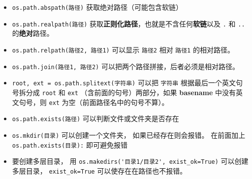 \begin{itemize}
\item \verb`os.path.abspath(路径)` 获取绝对路径（可能包含软链）
\item \verb`os.path.realpath(路径)` 获取\textbf{正则化路径}，也就是不含任何\textbf{软链}以及 \verb`.` 和 \verb`..` 的\textbf{绝对}路径。
\item \verb`os.path.relpath(路径2, 路径1)` 可以显示 \verb`路径2` 相对 \verb`路径1` 的相对路径。
\item \verb`os.path.join(路径1, 路径2)` 可以把两个路径拼接，后者必须是相对路径。
\item \verb`root, ext = os.path.splitext(字符串)` 可以把 \verb`字符串` 根据最后一个英文句号拆分成 \verb`root` 和 \verb`ext` （含前面的句号）两部分，如果 \textbf{basename} 中没有英文句号，则 \verb`ext` 为空（前面路径名中的句号不算）。
\item \verb`os.path.exists(路径)` 可以判断文件或文件夹是否存在
\item \verb`os.mkdir(目录)` 可以创建一个文件夹， 如果已经存在则会报错。 在前面加上 \verb`os.path.exists(目录):` 即可避免报错
\item 要创建多层目录， 用 \verb`os.makedirs('目录1/目录2', exist_ok=True)` 可以创建多层目录， \verb`exist_ok=True` 可以使存在在路径也不报错。
\end{itemize}
